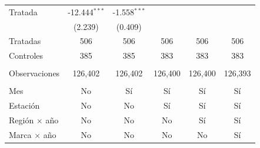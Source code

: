 \begin{tabular}{lccccc}
   Tratada              & -12.444$^{***}$ & -1.558$^{***}$ &                &                &   \\   
                        & (2.239)         & (0.409)        &                &                &   \\   
   Tratadas             & 506             & 506            & 506            & 506            & 506\\  
   Controles            & 385             & 385            & 383            & 383            & 383\\  
    \\
   Observaciones        & 126,402         & 126,402        & 126,400        & 126,400        & 126,393\\  
    \\
   Mes                  & No              & Sí             & Sí             & Sí             & Sí\\  
   Estación             & No              & No             & Sí             & Sí             & Sí\\  
   Región $\times$ año  & No              & No             & No             & Sí             & Sí\\  
   Marca $\times$ año   & No              & No             & No             & No             & Sí\\  
   \bottomrule
\end{tabular}
\par\endgroup


